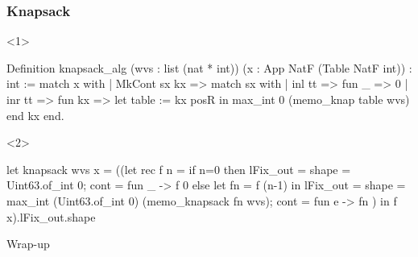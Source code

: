 \begin{frame}[fragile]
  \frametitle{Knapsack}
  \begin{onlyenv}<1>
  \begin{bluebox}
  \begin{center}
  \begin{coqcode}
Definition knapsack_alg (wvs : list (nat * int))
  (x : App NatF (Table NatF int)) : int
  := match x with
     | MkCont sx kx =>
       match sx with
       | inl tt => fun _ => 0
       | inr tt => fun kx => let table := kx posR in
                             max_int 0 (memo_knap table wvs)
       end kx
     end.
  \end{coqcode}
  \end{center}
  \end{bluebox}
  \end{onlyenv}
  \begin{onlyenv}<2>
  \begin{greenbox}
  \begin{center}
  \begin{ocamlcode}
let knapsack wvs x =
  ((let rec f n =
    if n=0 then
      { lFix_out = { shape = Uint63.of_int 0;
                     cont  = fun _ -> f 0 } }
    else
      let fn = f (n-1) in
      { lFix_out = { shape = max_int (Uint63.of_int 0)
                                     (memo_knapsack fn wvs);
                     cont = fun e -> fn } }
  ) in f x).lFix_out.shape
  \end{ocamlcode}
  \end{center}
  \end{greenbox}
  \end{onlyenv}
\end{frame}

\begin{frame}
  \vfill
  \centering
  \begin{sticky}
    {\normalfont Wrap-up}

    {\normalfont\Large \phantom{wrap-up}}
    \par%
  \end{sticky}
  \vfill
\end{frame}

